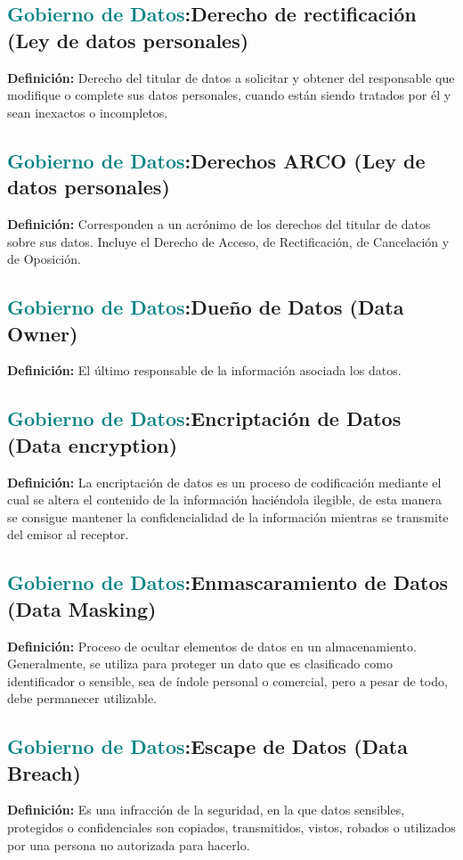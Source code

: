 \documentclass[12pt]{article}
\begin{document}
\subsection{\textcolor{teal}{Gobierno de Datos}:{Derecho de rectificación (Ley de datos personales)}}
\textbf{Definición:} Derecho del titular de datos a solicitar y obtener del responsable que modifique o complete sus datos personales, cuando están siendo tratados por él y sean inexactos o incompletos. 
\subsection{\textcolor{teal}{Gobierno de Datos}:{Derechos ARCO (Ley de datos personales)}}
\textbf{Definición:} Corresponden a un acrónimo de los derechos del titular de datos sobre sus datos. Incluye el Derecho de Acceso, de Rectificación, de Cancelación y de Oposición.
\subsection{\textcolor{teal}{Gobierno de Datos}:{Dueño de Datos (Data Owner)}}
\textbf{Definición:} El último responsable de la información asociada los datos.
\subsection{\textcolor{teal}{Gobierno de Datos}:{Encriptación de Datos (Data encryption)}}
\textbf{Definición:} La encriptación de datos es un proceso de codificación mediante el cual se altera el contenido de la información haciéndola ilegible, de esta manera se consigue mantener la confidencialidad de la información mientras se transmite del emisor al receptor.
\subsection{\textcolor{teal}{Gobierno de Datos}:{Enmascaramiento de Datos (Data Masking)}}
\textbf{Definición:} Proceso de ocultar elementos de datos en un almacenamiento. Generalmente, se utiliza para proteger un dato que es clasificado como identificador o sensible, sea de índole personal o comercial, pero a pesar de todo, debe permanecer utilizable.
\subsection{\textcolor{teal}{Gobierno de Datos}:{Escape de Datos (Data Breach)}}
\textbf{Definición:} Es una infracción de la seguridad, en la que datos sensibles, protegidos o confidenciales son copiados, transmitidos, vistos, robados o utilizados por una persona no autorizada para hacerlo.
\end{document}
